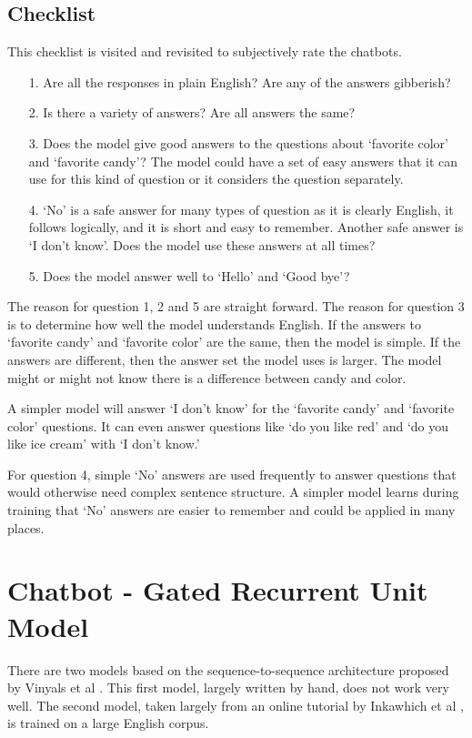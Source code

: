 \subsection{Checklist} 

This checklist is visited and revisited to subjectively rate the chatbots.

\begin{itemize}
	
	\item [1.] Are all the responses in plain English? Are any of the answers gibberish?
	
	\item [2.] Is there a  variety of answers? Are all answers the same?
	
	\item [3.] Does the model give good answers to the questions about `favorite color' and `favorite candy'? The model could have a set of easy answers that it can use for this kind of question or it considers the question separately. 
	
	\item [4.] `No' is a safe answer for many types of question as it is clearly English, it follows logically, and it is short and easy to remember. Another safe answer is `I don't know'. Does the model use these answers at all times?
	
	\item [5.] Does the model answer well to `Hello' and `Good bye'?
	
\end{itemize}

The reason for question 1, 2 and 5 are straight forward. The reason for question 3 is to determine how well the model understands English. If the answers to `favorite candy' and `favorite color' are the same, then the model is simple. If the answers are different, then the answer set the model uses is larger. The model might or might not know there is a difference between candy and color. 

A simpler model will answer `I don't know' for the `favorite candy' and `favorite color' questions. It can even answer questions like `do you like red' and `do you like ice cream' with `I don't know.' 

For question 4, simple `No' answers are used frequently to answer questions that would otherwise need complex sentence structure. A simpler model learns during training that `No' answers are easier to remember and could be applied in many places.

\section{Chatbot - Gated Recurrent Unit Model}
There are two models based on the sequence-to-sequence architecture proposed by Vinyals et al \cite{DBLP:journals/corr/VinyalsL15}. This first model, largely written by hand, does not work very well. The second model, taken largely from an online tutorial by  Inkawhich et al \cite{2018Inkawhich}, is trained on a large English corpus. 

